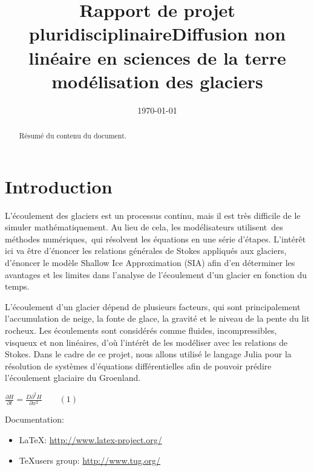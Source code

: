\documentclass{article}
\begin{document}
\title{Rapport de projet pluridisciplinaire}

\date{\today}
        
\newpage

\title{Diffusion non linéaire en sciences de la terre modélisation des glaciers}
 
\maketitle
\tableofcontents

\begin{abstract}
Résumé du contenu du document.
\end{abstract}

\newpage
\section{Introduction}\label{sec:intro}

L’écoulement des glaciers est un processus continu, mais il est très difficile de le simuler mathématiquement. Au lieu de cela, les modélisateurs utilisent des méthodes numériques, qui résolvent les équations en une série d’étapes.
L’intérêt ici va être d’énoncer les relations générales de Stokes appliqués aux glaciers, d’énoncer le modèle Shallow Ice Approximation (SIA) afin d’en déterminer les avantages et les limites dans l’analyse de l’écoulement d’un glacier en fonction du temps.

L’écoulement d’un glacier dépend de plusieurs facteurs, qui sont principalement l’accumulation de neige, la fonte de glace, la gravité et le niveau de la pente du lit rocheux.
Les écoulements sont considérés comme fluides, incompressibles, visqueux et non linéaires, d’où l’intérêt de les modéliser avec les relations de Stokes.
Dans le cadre de ce projet, nous allons utilisé le langage Julia pour la résolution de systèmes d'équations différentielles afin de pouvoir prédire l'écoulement glaciaire du Groenland.


\begin{center}
$\frac{\partial H}{\partial t}=\frac{D {\partial}^{2}H}{\partial x^{2}}\qquad(1)$
\end{center}

Documentation: 
\begin{itemize}
\item \LaTeX: \url{http://www.latex-project.org/} 
\item \TeX users group: \url{http://www.tug.org/}
\end{itemize}
\end{document}
